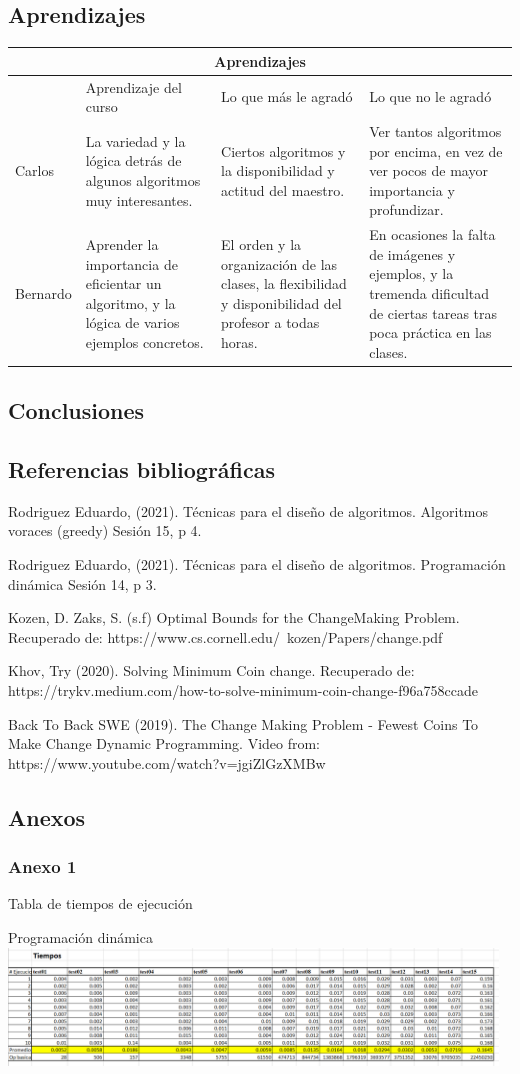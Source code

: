 \documentclass[12pt,letterpaper, titlepage, onecolumn]{article}
\begin{document}
\subsection{Aprendizajes}
\begin{tabular}{ |p{2cm}|p{4cm}|p{4cm}|p{4cm}| }
	\hline
	\multicolumn{4}{|c|}{Aprendizajes} \\
	\hline
	& Aprendizaje del curso &	Lo que más le agradó &	Lo que no le agradó \\
	\hline
	Carlos & La variedad y la lógica detrás de algunos algoritmos muy interesantes. & Ciertos algoritmos y la disponibilidad y actitud del maestro. & Ver tantos algoritmos por encima, en vez de ver pocos de mayor importancia y profundizar.\\
	\hline
	Bernardo & Aprender la importancia de eficientar un algoritmo, y la lógica de varios ejemplos concretos.  & El orden y la organización de las clases, la flexibilidad y disponibilidad del profesor a todas horas.  & En ocasiones la falta de imágenes y ejemplos, y la tremenda dificultad de ciertas tareas tras poca práctica en las clases.\\
	\hline
\end{tabular}

\subsection{Conclusiones}
	
\subsection{Referencias bibliográficas}
	\par Rodriguez Eduardo, (2021). Técnicas para el diseño de algoritmos. Algoritmos voraces (greedy) Sesión 15, p 4.
	\par Rodriguez Eduardo, (2021). Técnicas para el diseño de algoritmos. Programación dinámica Sesión 14, p 3.
	\par Kozen, D. Zaks, S. (s.f) Optimal Bounds for the ChangeMaking Problem. Recuperado de: https://www.cs.cornell.edu/~kozen/Papers/change.pdf
	\par Khov, Try (2020). Solving Minimum Coin change. Recuperado de: https://trykv.medium.com/how-to-solve-minimum-coin-change-f96a758ccade
	\par Back To Back SWE (2019). The Change Making Problem - Fewest Coins To Make Change Dynamic Programming. Video from: \\https://www.youtube.com/watch?v=jgiZlGzXMBw

\subsection{Anexos}
	\subsubsection{Anexo 1}
		\par Tabla de tiempos de ejecución
		\par Programación dinámica\\
		\includegraphics[width= 130mm]{img/TiemposDP.png}
\end{document}
